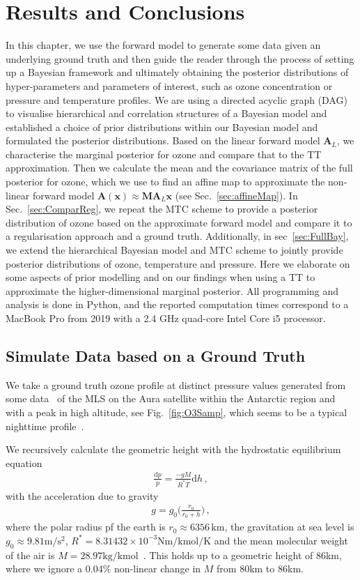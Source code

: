 \chapter{Results and Conclusions}
\label{ch:res}
In this chapter, we use the forward model to generate some data given an underlying ground truth and then guide the reader through the process of setting up a Bayesian framework and ultimately obtaining the posterior distributions of hyper-parameters and parameters of interest, such as ozone concentration or pressure and temperature profiles.
We are using a directed acyclic graph (DAG) to visualise hierarchical and correlation structures of a Bayesian model and established a choice of prior distributions within our Bayesian model and formulated the posterior distributions.
Based on the linear forward model $\bm{A}_L$, we characterise the marginal posterior for ozone and compare that to the TT approximation.
Then we calculate the mean and the covariance matrix of the full posterior for ozone, which we use to find an affine map to approximate the non-linear forward model $\bm{A}(\bm{x}) \approx \bm{M} \bm{A}_{L} \bm{x}$ (see Sec.~\ref{sec:affineMap}).
In Sec.~\ref{sec:ComparReg}, we repeat the MTC scheme to provide a posterior distribution of ozone based on the approximate forward model and compare it to a regularisation approach and a ground truth.
Additionally, in sec~\ref{sec:FullBay}, we extend the hierarchical Bayesian model and MTC scheme to jointly provide posterior distributions of ozone, temperature and pressure.
Here we elaborate on some aspects of prior modelling and on our findings when using a TT to approximate the higher-dimensional marginal posterior.
All programming and analysis is done in Python, and the reported computation times correspond to a MacBook Pro from 2019 with a 2.4 GHz quad-core Intel Core i5 processor.
\clearpage

\section{Simulate Data based on a Ground Truth}
We take a ground truth ozone profile at distinct pressure values generated from some data~\cite{MLSdata} of the MLS on the Aura satellite within the Antarctic region and with a peak in high altitude, see Fig.~\ref{fig:O3Samp}, which seems to be a typical nighttime profile~\cite{Lee2020NightOzone}.

We recursively calculate the geometric height with the hydrostatic equilibrium equation
\begin{align}
	\frac{\text{d}p}{p} = \frac{- g M}{R^* T} \text{d} h \, ,\label{eq:hydr}
\end{align}
with the acceleration due to gravity
\begin{align}
	g = g_0 \Bigg( \frac{r_0}{r_0 + h} \Bigg) \, ,
\end{align}
where the polar radius pf the earth is $r_0 \approx 6356 \, \text{km}$, the gravitation at sea level is $g_0 \approx 9.81 \text{m}/\text{s}^2$, $R^* = 8.31432 \times 10^{-3} \text{Nm} / \text{kmol} / \text{K}$ and the mean molecular weight of the air is $M = 28.97 \text{kg/kmol}$~\cite{atmosphere1976us}.
This holds up to a geometric height of $86$km, where we ignore a $0.04\%$ non-linear change in $M$ from $80$km to $86$km.


